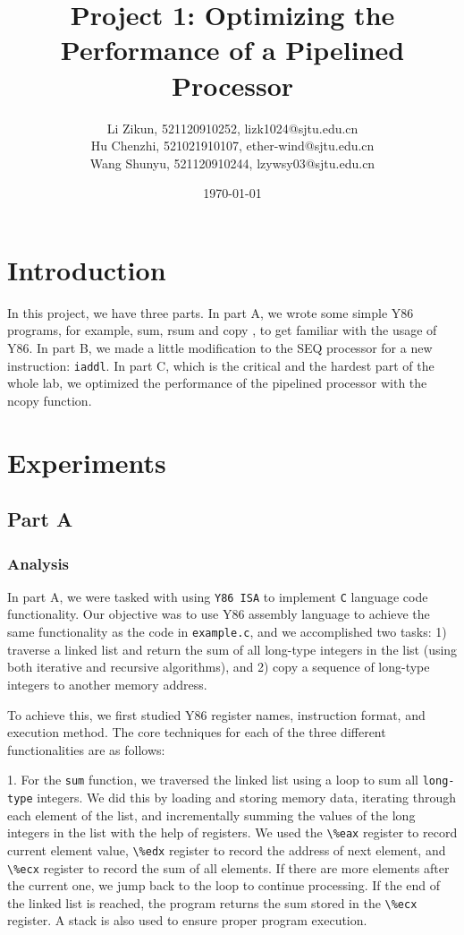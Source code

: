 \documentclass{article}
\title{\textbf{Project 1: Optimizing the Performance of a Pipelined Processor}} %
\author{Li Zikun, 521120910252, lizk1024@sjtu.edu.cn \\
        Hu Chenzhi, 521021910107,  ether-wind@sjtu.edu.cn \\
        Wang Shunyu, 521120910244, lzywsy03@sjtu.edu.cn } %
\date{\today} %
\begin{document}
\maketitle %

\section{Introduction}

In this project, we have three parts. In part A, we wrote some simple Y86 programs, for example, sum, rsum and copy , to get familiar with the usage of Y86. In part B, we made a little modification to the SEQ processor for a new instruction: \verb |iaddl|. In part C, which is the critical and the hardest part of the whole lab, we optimized the performance of the pipelined processor with the ncopy function.\\


\section{Experiments}

\subsection{Part A}

\subsubsection{Analysis}

In part A, we were tasked with using \verb |Y86 ISA| to implement \verb |C| language code functionality. Our objective was to use Y86 assembly language to achieve the same functionality as the code in \verb |example.c|, and we accomplished two tasks: 1) traverse a linked list and return the sum of all long-type integers in the list (using both iterative and recursive algorithms), and 2) copy a sequence of long-type integers to another memory address. 

To achieve this, we first studied Y86 register names, instruction format, and execution method. The core techniques for each of the three different functionalities are as follows:

1. For the \verb |sum| function, we traversed the linked list using a loop to sum all \verb |long-type| integers. We did this by loading and storing memory data, iterating through each element of the list, and incrementally summing the values of the long integers in the list with the help of registers. We used the \verb |\%eax| register to record current element value, \verb |\%edx| register to record the address of next element, and \verb |\%ecx| register to record the sum of all elements. If there are more elements after the current one, we jump back to the loop to continue processing. If the end of the linked list is reached, the program returns the sum stored in the \verb |\%ecx| register. A stack is also used to ensure proper program execution.
\end{document}
